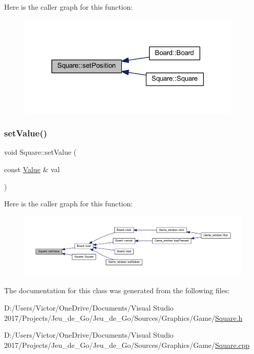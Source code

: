 Here is the caller graph for this function\+:\nopagebreak
\begin{figure}[H]
\begin{center}
\leavevmode
\includegraphics[width=302pt]{class_square_a9040f1ca39b88b8d9ac2a90648b1fb20_icgraph}
\end{center}
\end{figure}
\mbox{\label{class_square_a5fa0cbfce721c687308eec8e1a029d25}} 
\subsubsection{\texorpdfstring{set\+Value()}{setValue()}}
{\footnotesize\ttfamily void Square\+::set\+Value (\begin{DoxyParamCaption}\item[{const \hyperlink{class_square_a7feeec236c037a9849114226adaa4ecc}{Value} \&}]{val }\end{DoxyParamCaption})}

Here is the caller graph for this function\+:\nopagebreak
\begin{figure}[H]
\begin{center}
\leavevmode
\includegraphics[width=350pt]{class_square_a5fa0cbfce721c687308eec8e1a029d25_icgraph}
\end{center}
\end{figure}


The documentation for this class was generated from the following files\+:\begin{DoxyCompactItemize}
\item 
D\+:/\+Users/\+Victor/\+One\+Drive/\+Documents/\+Visual Studio 2017/\+Projects/\+Jeu\+\_\+de\+\_\+\+Go/\+Jeu\+\_\+de\+\_\+\+Go/\+Sources/\+Graphics/\+Game/\hyperlink{_square_8h}{Square.\+h}\item 
D\+:/\+Users/\+Victor/\+One\+Drive/\+Documents/\+Visual Studio 2017/\+Projects/\+Jeu\+\_\+de\+\_\+\+Go/\+Jeu\+\_\+de\+\_\+\+Go/\+Sources/\+Graphics/\+Game/\hyperlink{_square_8cpp}{Square.\+cpp}\end{DoxyCompactItemize}
